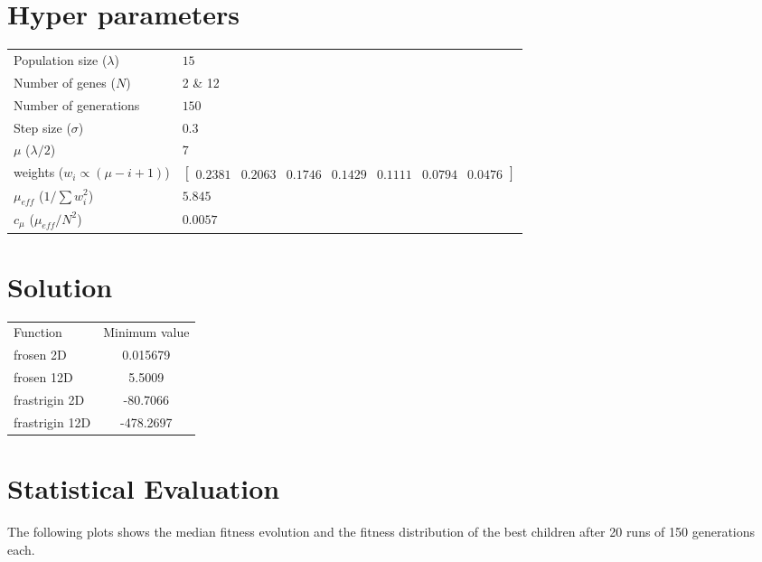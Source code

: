 \documentclass[paper=a4, fontsize=11pt]{scrartcl} %
\title{\hmwkClass \\
       \hmwkTitle}
\author{\hmwkAuthorFullName}
\date{\hmwkDueDate}
\begin{document}
    \maketitle
    \thispagestyle{fancy}

\section{Hyper parameters}

    \begin{tabular}{ll}
        Population size ($\lambda$) & $15$ \\
        Number of genes ($N$)       & 2 \& 12 \\
        Number of generations       & $150$ \\
        Step size ($\sigma$)        & $0.3$ \\
        $\mu$ ($\lambda / 2$)       & $7$ \\
        weights ($w_i \propto (\mu - i + 1)$)
        & $\left[ \begin{matrix}
        0.2381 & 0.2063 & 0.1746 & 0.1429 & 0.1111 & 0.0794 & 0.0476
        \end{matrix} \right]$ \\
        $\mu_{eff}$ ($1 / \sum w_i^2$)
        & $5.845$ \\
        $c_\mu$ ($\mu_{eff} / N^2$) & $0.0057$ \\
    \end{tabular}


    \section{Solution}
    \begin{tabular}{p{5cm}c}
        Function & Minimum value\\
        frosen 2D & 0.015679 \\
        frosen 12D & 5.5009 \\
        frastrigin 2D & -80.7066 \\
        frastrigin 12D & -478.2697 \\
    \end{tabular}


    \section{Statistical Evaluation}

    The following plots shows the median fitness evolution and the fitness distribution of the best children after 20 runs of 150 generations each.
\end{document}
